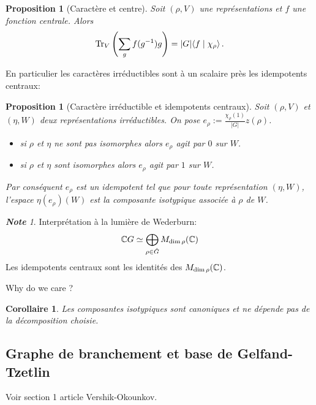 \documentclass[francais,a4paper,11pt,reqno]{amsart}
\theoremstyle{plain}
\newtheorem{COR}[THEO]{\bf Corollaire}
\newtheorem{PROP}[THEO]{\bf Proposition}
\theoremstyle{definition}
\theoremstyle{remark}
\newtheorem{NOTE}[THEO]{\bf Note}
\begin{document}
\begin{PROP}[Caractère et centre]
  Soit $(\rho, V)$ une représentations et $f$ une fonction
  centrale. Alors
  \begin{equation}
    \operatorname{Tr}_V\left(\sum_g f(g^{-1})g\right) = |G|\langle f\mid\chi_\rho\rangle\,.
  \end{equation}
\end{PROP}
En particulier les caractères irréductibles sont à un scalaire près les
idempotents centraux:
\begin{PROP}[Caractère irréductible et idempotents centraux]
  Soit $(\rho, V)$ et $(\eta, W)$ deux représentations irréductibles.  On pose
  $e_\rho := \frac{\chi_\rho(1)}{|G|} z(\rho)$.
  \begin{itemize}
  \item si $\rho$ et $\eta$ ne sont pas isomorphes alors $e_\rho$ agit par $0$
    sur $W$.
  \item si $\rho$ et $\eta$ sont isomorphes alors $e_\rho$ agit par $1$ sur $W$.
  \end{itemize}
  Par conséquent $e_\rho$ est un idempotent tel que pour toute représentation
  $(\eta,W)$, l'espace $\eta(e_\rho)(W)$ est la composante isotypique associée
  à $\rho$ de $W$.
\end{PROP}
\begin{NOTE}
  Interprétation à la lumière de Wederburn:
  \begin{equation}
    {\mathbb C} G \simeq \bigoplus_{\rho\in\hat{G}} M_{\dim \rho}({\mathbb C})
  \end{equation}
  Les idempotents centraux sont les identités des $M_{\dim \rho}({\mathbb C})$.
\end{NOTE}
Why do we care ?
\begin{COR}
  Les composantes isotypiques sont canoniques et ne dépende pas de la
  décomposition choisie.
\end{COR}

\subsection{Graphe de branchement et base de Gelfand-Tzetlin}
Voir section 1 article Vershik-Okounkov.
\end{document}
